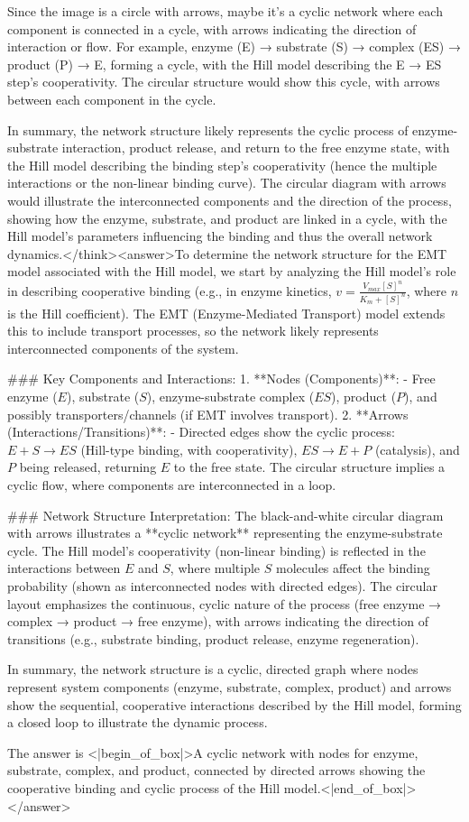 Since the image is a circle with arrows, maybe it's a cyclic network where each component is connected in a cycle, with arrows indicating the direction of interaction or flow. For example, enzyme (E) → substrate (S) → complex (ES) → product (P) → E, forming a cycle, with the Hill model describing the E → ES step's cooperativity. The circular structure would show this cycle, with arrows between each component in the cycle.

In summary, the network structure likely represents the cyclic process of enzyme-substrate interaction, product release, and return to the free enzyme state, with the Hill model describing the binding step's cooperativity (hence the multiple interactions or the non-linear binding curve). The circular diagram with arrows would illustrate the interconnected components and the direction of the process, showing how the enzyme, substrate, and product are linked in a cycle, with the Hill model's parameters influencing the binding and thus the overall network dynamics.</think><answer>To determine the network structure for the EMT model associated with the Hill model, we start by analyzing the Hill model’s role in describing cooperative binding (e.g., in enzyme kinetics, \( v = \frac{V_{max}[S]^n}{K_m + [S]^n} \), where \( n \) is the Hill coefficient). The EMT (Enzyme-Mediated Transport) model extends this to include transport processes, so the network likely represents interconnected components of the system.  

### Key Components and Interactions:  
1. **Nodes (Components)**:  
   - Free enzyme (\( E \)), substrate (\( S \)), enzyme-substrate complex (\( ES \)), product (\( P \)), and possibly transporters/channels (if EMT involves transport).  
2. **Arrows (Interactions/Transitions)**:  
   - Directed edges show the cyclic process: \( E + S \rightarrow ES \) (Hill-type binding, with cooperativity), \( ES \rightarrow E + P \) (catalysis), and \( P \) being released, returning \( E \) to the free state. The circular structure implies a cyclic flow, where components are interconnected in a loop.  

### Network Structure Interpretation:  
The black-and-white circular diagram with arrows illustrates a **cyclic network** representing the enzyme-substrate cycle. The Hill model’s cooperativity (non-linear binding) is reflected in the interactions between \( E \) and \( S \), where multiple \( S \) molecules affect the binding probability (shown as interconnected nodes with directed edges). The circular layout emphasizes the continuous, cyclic nature of the process (free enzyme → complex → product → free enzyme), with arrows indicating the direction of transitions (e.g., substrate binding, product release, enzyme regeneration).  

In summary, the network structure is a cyclic, directed graph where nodes represent system components (enzyme, substrate, complex, product) and arrows show the sequential, cooperative interactions described by the Hill model, forming a closed loop to illustrate the dynamic process.  

The answer is <|begin_of_box|>A cyclic network with nodes for enzyme, substrate, complex, and product, connected by directed arrows showing the cooperative binding and cyclic process of the Hill model.<|end_of_box|></answer>